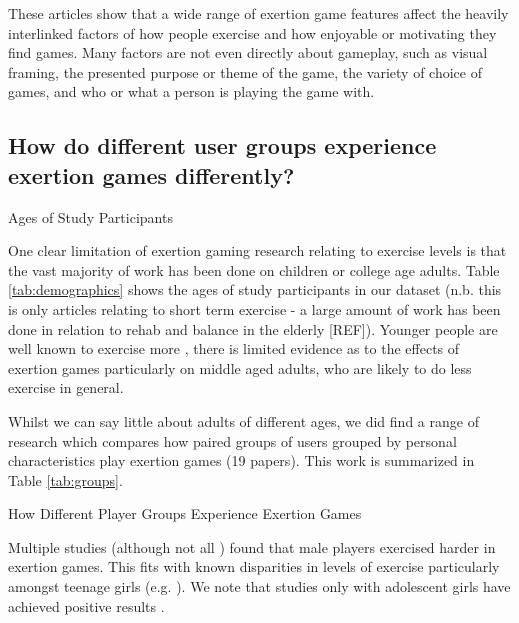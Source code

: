 These articles show that a wide range of exertion game features affect the heavily interlinked factors of how people exercise and how enjoyable or motivating they find games. Many factors are not even directly about gameplay, such as visual framing, the presented purpose or theme of the game, the variety of choice of games, and who or what a person is playing the game with. 

\subsection{How do different user groups experience exertion games differently?}

\begin{table}
\caption{Ages of Study Participants}
\label{tab:demographics}
\centering

\end{table}

One clear limitation of exertion gaming research relating to exercise levels is that the vast majority of work has been done on children or college age adults. Table \ref{tab:demographics} shows the ages of study participants in our dataset (n.b. this is only articles relating to short term exercise - a large amount of work has been done in relation to rehab and balance in the elderly [REF]). Younger people are well known to exercise more \cite{bhf_2015},  there is limited evidence as to the effects of exertion games particularly on middle aged adults, who are likely to do less exercise in general.  

Whilst we can say little about adults of different ages, we did find a range of research which compares how paired groups of users grouped by personal characteristics play exertion games (19 papers). This work is summarized in Table \ref{tab:groups}. 

\begin{table}
\caption{How Different Player Groups Experience Exertion Games}
\label{tab:groups}
\centering

\end{table}

Multiple studies \cite{Clevenger2015EnergyKinect,McNarry2016InvestigatingChildren,Lam2011PlayAlternatives} (although not all \cite{Lin2015TheGames}) found that male players exercised harder in exertion games. This fits with known disparities in levels of exercise particularly amongst teenage girls (e.g. \cite{te2007patterns}). We note that studies only with adolescent girls have achieved positive results \cite{Fawkner2010AdolescentGaming}.


